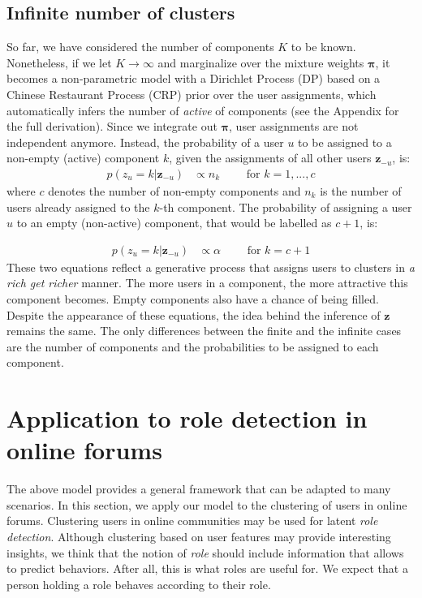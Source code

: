 \documentclass[smallextended]{svjour3}          %
\begin{document}
\subsection{Infinite number of clusters}\label{sec:CRP}
So far, we have considered the number of components $K$ to be known. Nonetheless, if we let $K \rightarrow \infty$ and marginalize over the mixture weights $\boldsymbol{\pi}$, it becomes a non-parametric model with a Dirichlet Process (DP) based on a Chinese Restaurant Process (CRP) prior over the user assignments, which automatically infers the number of \textit{active} of components (see the Appendix for the full derivation). Since we integrate out $\boldsymbol{\pi}$, user assignments are not independent anymore.
Instead, the probability of a user $u$ to be assigned to a non-empty (active) component $k$, given the assignments of all other users $\mathbf{z}_{-u}$, is:
\begin{align}
	p(z_u = k | \mathbf{z}_{-u}) &\propto n_k \qquad \text{ for } k = 1,...,c
\end{align}
%
where $c$ denotes the number of non-empty components and $n_k$ is the number of users already assigned to the $k$-th component. The probability of assigning a user $u$ to an empty (non-active) component, that would be labelled as $c+1$, is: 

\begin{align}
	p(z_u = k | \mathbf{z}_{-u}) &\propto \alpha \qquad  \text{ for } k=c+1
\end{align}
%
These two equations reflect a generative process that assigns users to clusters in \textit{a rich get richer} manner. The more users in a component, the more attractive this component becomes. Empty components also have a chance of being filled. 
Despite the appearance of these equations, the idea behind the inference of $\mathbf{z}$ remains the same. The only differences between the finite and the infinite cases are the number of components and the probabilities to be assigned to each component.



\section{Application to role detection in online forums}\label{sec:forums}

The above model provides a general framework that can be adapted to many scenarios. In this section, we apply our model to the clustering of users in online forums. Clustering users in online communities may be used for latent \textit{role detection}. Although clustering based on user features may provide interesting insights, we think that the notion of \textit{role} should include information that allows to predict behaviors. After all, this is what roles are useful for. We expect that a person holding a role behaves according to their role.
\end{document}
